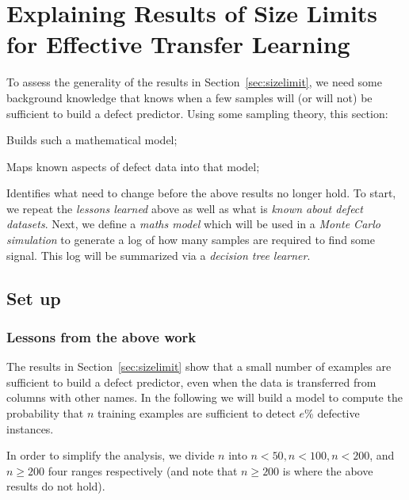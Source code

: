 

%

\newcommand{\tion}[1]{Section~\ref{sect:#1}}
\newcommand{\eq}[1]{Equation~\ref{eq:#1}}

\section{Explaining Results of Size Limits for Effective Transfer Learning}\label{sect:xplain}
To assess the generality of the results in Section~\ref{sec:sizelimit}, we need some background knowledge that knows when a few samples will (or will not)
be sufficient to build a defect predictor. Using some sampling theory, this section:
\squishlist
\item
Builds such a mathematical model;
\item Maps known aspects
of defect data  into that model;
\item Identifies what need to change before the above results no longer hold.
\squishend
To start, we repeat the {\em lessons learned} above as well as what is {\em known about defect datasets}.
Next, we define a {\em maths model} which will be used in a {\em Monte Carlo simulation} to generate a log of how many samples are required
to find some signal. This log will be summarized via a {\em decision tree learner}.

\subsection{Set up}
\subsubsection{ Lessons from the above work}

The results in Section~\ref{sec:sizelimit} show
that a small number
of examples are sufficient to build a defect predictor, even when the data is  transferred from columns with other names.
In the following we will build a model to compute the probability that $n$ training examples are sufficient to detect $e$\% defective instances.

In order to simplify the analysis, we divide $n$ into
  $n<50, n<100, n<200$, and $n\ge 200$ four ranges respectively (and note that $n  \ge 200$ is where the above
  results do not hold).

